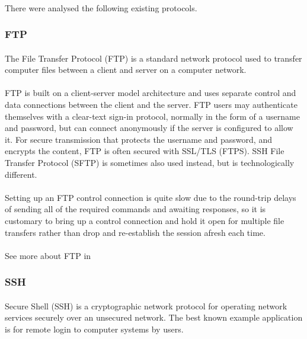 \paragraph{}
There were analysed the following existing protocols.

\subsubsection{FTP}
\paragraph{}
The File Transfer Protocol (FTP) is a standard network protocol used to transfer computer files between a client and server on a computer network.
\paragraph{}
FTP is built on a client-server model architecture and uses separate control and data connections between the client and the server. FTP users may authenticate themselves with a clear-text sign-in protocol, normally in the form of a username and password, but can connect anonymously if the server is configured to allow it. For secure transmission that protects the username and password, and encrypts the content, FTP is often secured with SSL/TLS (FTPS). SSH File Transfer Protocol (SFTP) is sometimes also used instead, but is technologically different.
\paragraph{}
Setting up an FTP control connection is quite slow due to the round-trip delays of sending all of the required commands and awaiting responses, so it is customary to bring up a control connection and hold it open for multiple file transfers rather than drop and re-establish the session afresh each time. 
\paragraph{}
See more about FTP in \cite{FTP}


\subsubsection{SSH}
\paragraph{} 
Secure Shell (SSH) is a cryptographic network protocol for operating network services securely over an unsecured network. The best known example application is for remote login to computer systems by users.
